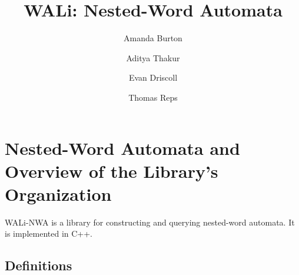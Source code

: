 \documentclass{llncs}
\begin{document}
\pagestyle{plain}
\title{WALi: Nested-Word Automata}

\author{Amanda Burton \and Aditya Thakur \and Evan Driscoll \and Thomas Reps}
\date{}
\maketitle


\newcommand{\TODO}[1]{\mbox{\bf [TODO #1]}}

\section{Nested-Word Automata and Overview of the Library's Organization}
\label{Se:Nested Word Automata}

WALi-NWA is a library for constructing and querying nested-word automata.  It is implemented in C++.

\subsection{Definitions}
\label{Se:Def}
\end{document}
